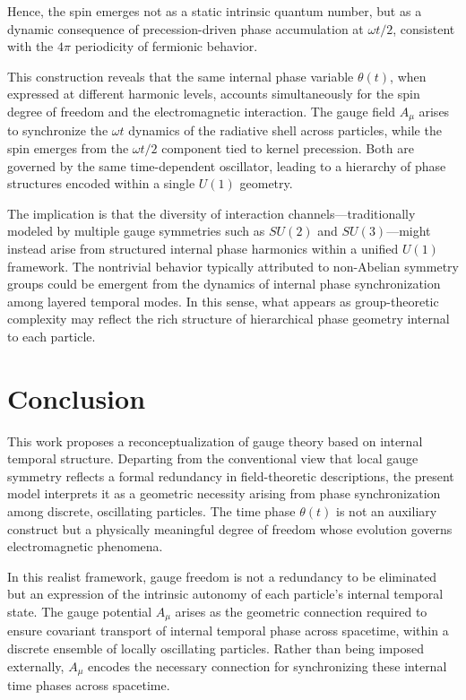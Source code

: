 \documentclass[%
 reprint,
 amsmath,amssymb,
 aps,
]{revtex4-1}
\numberwithin{equation}{section}%
\begin{document}
Hence, the spin emerges not as a static intrinsic quantum number, but as a dynamic consequence of precession-driven phase accumulation at $\omega t/2$, consistent with the $4\pi$ periodicity of fermionic behavior.

This construction reveals that the same internal phase variable $\theta(t)$, when expressed at different harmonic levels, accounts simultaneously for the spin degree of freedom and the electromagnetic interaction. The gauge field $A_\mu$ arises to synchronize the $\omega t$ dynamics of the radiative shell across particles, while the spin emerges from the $\omega t/2$ component tied to kernel precession. Both are governed by the same time-dependent oscillator, leading to a hierarchy of phase structures encoded within a single $U(1)$ geometry.

The implication is that the diversity of interaction channels—traditionally modeled by multiple gauge symmetries such as $SU(2)$ and $SU(3)$—might instead arise from structured internal phase harmonics within a unified $U(1)$ framework. The nontrivial behavior typically attributed to non-Abelian symmetry groups could be emergent from the dynamics of internal phase synchronization among layered temporal modes. In this sense, what appears as group-theoretic complexity may reflect the rich structure of hierarchical phase geometry internal to each particle.



\newpage



\section{Conclusion}

This work proposes a reconceptualization of gauge theory based on internal temporal structure. Departing from the conventional view that local gauge symmetry reflects a formal redundancy in field-theoretic descriptions, the present model interprets it as a geometric necessity arising from phase synchronization among discrete, oscillating particles. The time phase $\theta(t)$ is not an auxiliary construct but a physically meaningful degree of freedom whose evolution governs electromagnetic phenomena.

In this realist framework, gauge freedom is not a redundancy to be eliminated but an expression of the intrinsic autonomy of each particle's internal temporal state. The gauge potential $A_\mu$ arises as the geometric connection required to ensure covariant transport of internal temporal phase across spacetime, within a discrete ensemble of locally oscillating particles. Rather than being imposed externally, $A_\mu$ encodes the necessary connection for synchronizing these internal time phases across spacetime.
\end{document}
